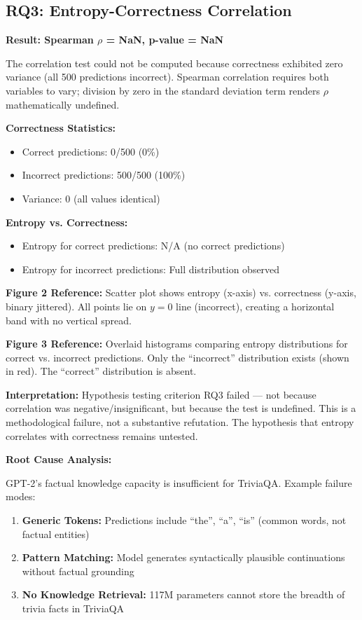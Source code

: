 \subsection{RQ3: Entropy-Correctness Correlation}

\textbf{Result: Spearman $\rho$ = NaN, p-value = NaN}

The correlation test could not be computed because correctness exhibited zero variance (all 500 predictions incorrect). Spearman correlation requires both variables to vary; division by zero in the standard deviation term renders $\rho$ mathematically undefined.

\textbf{Correctness Statistics:}
\begin{itemize}
\item Correct predictions: 0/500 (0\%)
\item Incorrect predictions: 500/500 (100\%)
\item Variance: 0 (all values identical)
\end{itemize}

\textbf{Entropy vs. Correctness:}
\begin{itemize}
\item Entropy for correct predictions: N/A (no correct predictions)
\item Entropy for incorrect predictions: Full distribution observed
\end{itemize}

\textbf{Figure 2 Reference:} Scatter plot shows entropy (x-axis) vs. correctness (y-axis, binary jittered). All points lie on $y=0$ line (incorrect), creating a horizontal band with no vertical spread.

\textbf{Figure 3 Reference:} Overlaid histograms comparing entropy distributions for correct vs. incorrect predictions. Only the ``incorrect'' distribution exists (shown in red). The ``correct'' distribution is absent.

\textbf{Interpretation:} Hypothesis testing criterion RQ3 failed --- not because correlation was negative/insignificant, but because the test is undefined. This is a methodological failure, not a substantive refutation. The hypothesis that entropy correlates with correctness remains untested.

\textbf{Root Cause Analysis:}

GPT-2's factual knowledge capacity is insufficient for TriviaQA. Example failure modes:

\begin{enumerate}
\item \textbf{Generic Tokens:} Predictions include ``the'', ``a'', ``is'' (common words, not factual entities)
\item \textbf{Pattern Matching:} Model generates syntactically plausible continuations without factual grounding
\item \textbf{No Knowledge Retrieval:} 117M parameters cannot store the breadth of trivia facts in TriviaQA
\end{enumerate}

